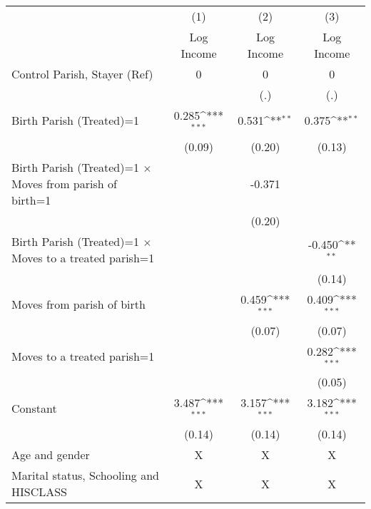 {
\def\sym#1{\ifmmode^{#1}\else\(^{#1}\)\fi}
\begin{tabular}{l*{3}{c}}
\hline\hline
                    &\multicolumn{1}{c}{(1)}&\multicolumn{1}{c}{(2)}&\multicolumn{1}{c}{(3)}\\
                    &\multicolumn{1}{c}{Log Income}&\multicolumn{1}{c}{Log Income}&\multicolumn{1}{c}{Log Income}\\
\hline
Control Parish, Stayer (Ref) &         0            &       0         &       0         \\
                    &                     &         (.)         &         (.)         \\
Birth Parish (Treated)=1&          0.285\sym{***}           &       0.531\sym{**} &       0.375\sym{**} \\
                    &                (0.09)      &      (0.20)         &      (0.13)         \\
Birth Parish (Treated)=1 $\times$ Moves from parish of birth=1&                     &      -0.371         &                     \\
                    &                     &      (0.20)         &                     \\
Birth Parish (Treated)=1 $\times$ Moves to a treated parish=1&                     &                     &      -0.450\sym{**} \\
                    &                     &                     &      (0.14)         \\
Moves from parish of birth&                     &        0.459\sym{***}             &       0.409\sym{***}\\
                    &                     &               (0.07)      &      (0.07)         \\
Moves to a treated parish=1&                     &                     &       0.282\sym{***}\\
                    &                     &                     &      (0.05)         \\
Constant            &       3.487\sym{***}&       3.157\sym{***}&       3.182\sym{***}\\
                    &      (0.14)         &      (0.14)         &      (0.14)         \\

                    \hline

                    Age and gender                 &        X  &        X  &        X        \\
                Marital status, Schooling and HISCLASS   &         X    &        X  &        X   \\
                

\end{tabular}}
